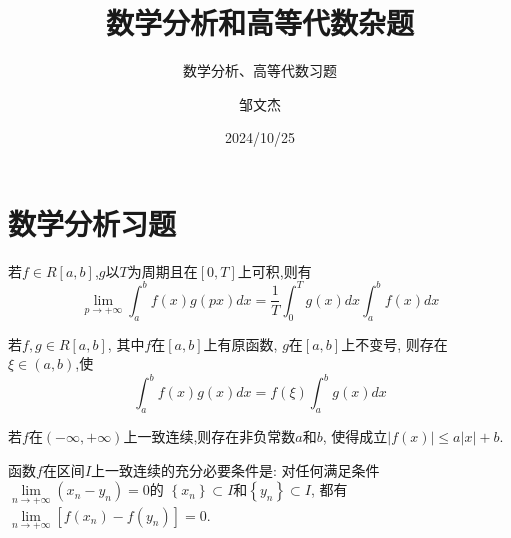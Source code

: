 \documentclass[lang=cn,newtx,10pt,scheme=chinese]{elegantbook}
\title{数学分析和高等代数杂题}
\subtitle{数学分析、高等代数习题}
\author{邹文杰}
\institute{无}
\date{2024/10/25}
\begin{document}
\maketitle
\frontmatter

\tableofcontents

\mainmatter
\everymath{\displaystyle} %


\chapter{数学分析习题}

\begin{lemma}[Riemann 引理] \label{thm:Riemann}
  若$f\in R\left[ a,b \right] $,$g$以$T$为周期且在$\left[ 0,T \right] $上可积,则有
  \begin{equation}
    \underset{p\rightarrow +\infty}{\lim}\int_a^b{f\left( x \right) g\left( px \right) dx=\frac{1}{T}}\int_0^T{g\left( x \right) dx}\int_a^b{f\left( x \right) dx}
  \end{equation}
\end{lemma}

\begin{theorem}[积分第一中值定理的推广] \label{thm:JFDYZZ}
  若$f,g\in R\left[ a,b \right] $,
  其中$f$在$\left[ a,b \right] $上有原函数,
  $g$在$\left[ a,b \right] $上不变号,
  则存在$\xi \in \left( a,b \right) $,使
  \begin{equation}
    \int_a^b{f\left( x \right) g\left( x \right) dx}=f\left( \xi \right) \int_a^b{g\left( x \right) dx}
  \end{equation}
\end{theorem}

\begin{proposition} \label{pro:YZLXHS}
  若$f$在$\left( -\infty ,+\infty \right) $上一致连续,则存在非负常数$a$和$b$,
  使得成立$\left| f\left( x \right) \right|\leqslant a\left| x \right|+b$.
\end{proposition}

\begin{proposition} \label{pro:HSYZLXCYTJ}
  函数$f$在区间$I$上一致连续的充分必要条件是:
  对任何满足条件$\underset{n\rightarrow +\infty}{\lim}\left( x_n-y_n \right) =0$的
  $\left\{ x_n \right\} \subset I$和$\left\{ y_n \right\} \subset I$,
  都有$\underset{n\rightarrow +\infty}{\lim}\left[ f\left( x_n \right) -f\left( y_n \right) \right] =0$.
\end{proposition}


\newpage
\end{document}
